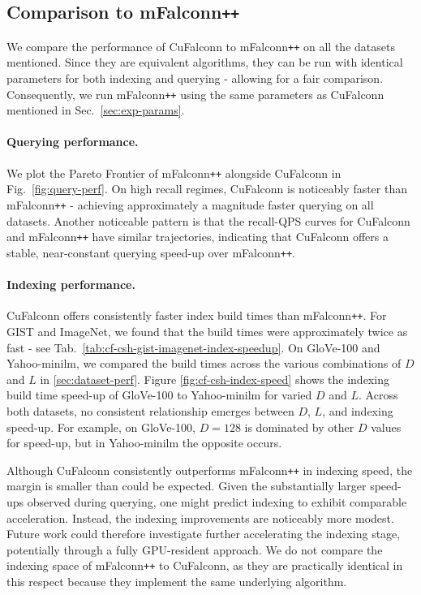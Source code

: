 \documentclass{article}
\newcommand{\cf}{CuFalconn\xspace}
\newcommand{\glv}{GloVe-100\xspace}
\newcommand{\ymlm}{Yahoo-minilm\xspace}
\begin{document}
\subsection{Comparison to mFalconn\texttt{++}}
\label{sec:faiss-compare}

We compare the performance of \cf to mFalconn\texttt{++} on all the datasets mentioned. Since they are equivalent algorithms, they can be run with identical parameters for both indexing and querying - allowing for a fair comparison. Consequently, we run mFalconn\texttt{++} using the same parameters as \cf mentioned in Sec.~\ref{sec:exp-params}. 

\paragraph{Querying performance.} We plot the Pareto Frontier of mFalconn\texttt{++} alongside \cf in Fig.~\ref{fig:query-perf}. On high recall regimes, \cf is noticeably faster than mFalconn\texttt{++} - achieving approximately a magnitude faster querying on all datasets. Another noticeable pattern is that the recall-QPS curves for \cf and mFalconn\texttt{++} have similar trajectories, indicating that \cf offers a stable, near-constant querying speed-up over mFalconn\texttt{++}. 

\paragraph{Indexing performance.} \cf offers consistently faster index build times than mFalconn\texttt{++}. For GIST and ImageNet, we found that the build times were approximately twice as fast - see Tab.~\ref{tab:cf-csh-gist-imagenet-index-speedup}. On \glv and \ymlm, we compared the build times across the various combinations of $D$ and $L$ in \ref{sec:dataset-perf}. Figure \ref{fig:cf-csh-index-speed} shows the indexing build time speed-up of \glv to \ymlm for varied $D$ and $L$. Across both datasets, no consistent relationship emerges between $D$, $L$, and indexing speed-up. For example, on \glv, $D=128$ is dominated by other $D$ values for speed-up, but in \ymlm the opposite occurs.

Although \cf consistently outperforms mFalconn\texttt{++} in indexing speed, the margin is smaller than could be expected. Given the substantially larger speed-ups observed during querying, one might predict indexing to exhibit comparable acceleration. Instead, the indexing improvements are noticeably more modest. Future work could therefore investigate further accelerating the indexing stage, potentially through a fully GPU-resident approach. We do not compare the indexing space of mFalconn\texttt{++} to \cf, as they are practically identical in this respect because they implement the same underlying algorithm.
\end{document}
